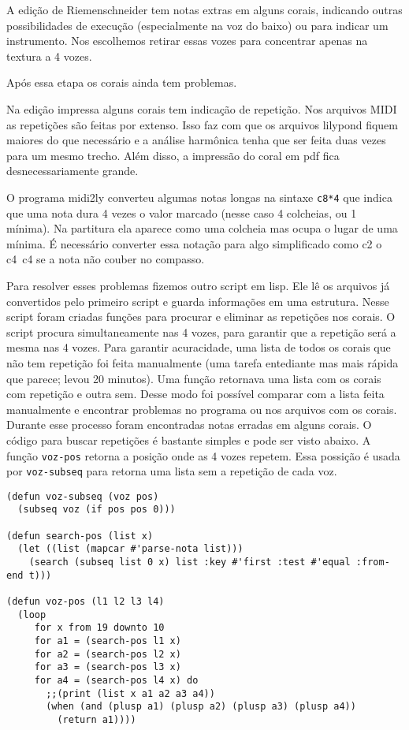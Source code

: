 \documentclass[12pt,brazil]{book}
\begin{document}
A edição de Riemenschneider tem notas extras em alguns corais,
indicando outras possibilidades de execução (especialmente na voz do
baixo) ou para indicar um instrumento. Nos escolhemos retirar essas
vozes para concentrar apenas na textura a 4 vozes.

Após essa etapa os corais ainda tem problemas. 

Na edição impressa alguns corais tem indicação de repetição. Nos
arquivos MIDI as repetições são feitas por extenso. Isso faz com que
os arquivos lilypond fiquem maiores do que necessário e a análise
harmônica tenha que ser feita duas vezes para um mesmo trecho. Além
disso, a impressão do coral em pdf fica desnecessariamente grande.

O programa midi2ly converteu algumas notas longas na sintaxe
\texttt{c8*4} que indica que uma nota dura 4 vezes o valor marcado
(nesse caso 4 colcheias, ou 1 mínima). Na partitura ela aparece como
uma colcheia mas ocupa o lugar de uma mínima. É necessário converter
essa notação para algo simplificado como c2 o c4~c4 se a nota não
couber no compasso.

Para resolver esses problemas fizemos outro script em lisp. Ele lê os
arquivos já convertidos pelo primeiro script e guarda informações em
uma estrutura. Nesse script foram criadas funções para procurar e
eliminar as repetições nos corais. O script procura simultaneamente
nas 4 vozes, para garantir que a repetição será a mesma nas 4 vozes.
Para garantir acuracidade, uma lista de todos os corais que não tem
repetição foi feita manualmente (uma tarefa entediante mas mais rápida
que parece; levou 20 minutos). Uma função retornava uma lista com os
corais com repetição e outra sem. Desse modo foi possível comparar com
a lista feita manualmente e encontrar problemas no programa ou nos
arquivos com os corais. Durante esse processo foram encontradas notas
erradas em alguns corais. O código para buscar repetições é bastante
simples e pode ser visto abaixo. A função \texttt{voz-pos} retorna a
posição onde as 4 vozes repetem. Essa possição é usada por
\texttt{voz-subseq} para retorna uma lista sem a repetição de cada
voz.

\begin{verbatim}
(defun voz-subseq (voz pos)
  (subseq voz (if pos pos 0)))
  
(defun search-pos (list x)
  (let ((list (mapcar #'parse-nota list)))
    (search (subseq list 0 x) list :key #'first :test #'equal :from-end t)))

(defun voz-pos (l1 l2 l3 l4)
  (loop
     for x from 19 downto 10
     for a1 = (search-pos l1 x)
     for a2 = (search-pos l2 x)
     for a3 = (search-pos l3 x)
     for a4 = (search-pos l4 x) do
       ;;(print (list x a1 a2 a3 a4))
       (when (and (plusp a1) (plusp a2) (plusp a3) (plusp a4))
         (return a1))))
\end{verbatim}
\end{document}
